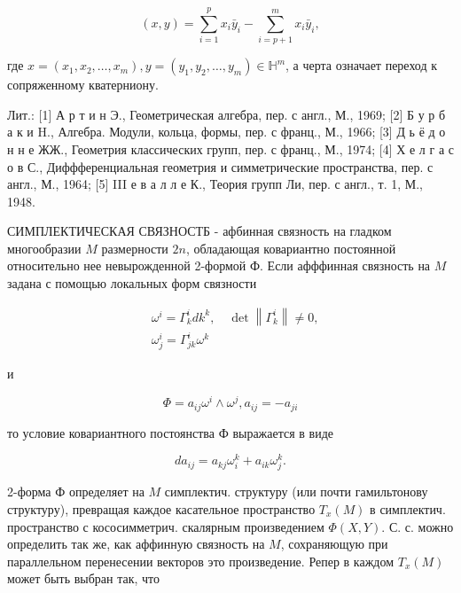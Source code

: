 \documentclass[10pt]{article}
\begin{document}
\[

(x, y)=\sum_{i=1}^{p} x_{i} \bar{y}_{i}-\sum_{i=p+1}^{m} x_{i} \bar{y}_{i},

\]



где $x=\left(x_{1}, x_{2}, \ldots, x_{m}\right), y=\left(y_{1}, y_{2}, \ldots, y_{m}\right) \in \mathbb{H}^{m}$, а черта означает переход к сопряженному кватерниону.



Лит.: [1] А р т и н Э., Геометрическая алгебра, пер. с англ., М., 1969; [2] Б у р б а к и H., Алгебра. Модули, кольца, формы, пер. с франц., М., 1966; [3] Д ь ё д о н н е ЖЖ., Геометрия классических групп, пер. с франц., М., 1974; [4] Х е л г а с о в С., Диффференциальная геометрия и симметрические пространства, пер. с англ., М., 1964; [5] III е в а л л е К., Теория групп Ли, пер. с англ., т. 1, М., 1948.



СИМПЛЕКТИЧЕСКАЯ СВЯЗНОСТБ - афбинная связность на гладком многообразии $M$ размерности $2 n$, обладающая ковариантно постоянной относительно нее невырожденной 2-формой Ф. Если афффинная связность на $M$ задана с помощью локальных форм связности



\[

\begin{aligned}

& \omega^{i}=\Gamma_{k}^{i} d k^{k}, \quad \operatorname{det}\left\|\Gamma_{k}^{i}\right\| \neq 0, \\

& \omega_{j}^{i}=\Gamma_{j k}^{i} \omega^{k}

\end{aligned}

\]



и



\[

\Phi=a_{i j} \omega^{i} \wedge \omega^{j}, a_{i j}=-a_{j i}

\]



то условие ковариантного постоянства Ф выражается в виде



\[

d a_{i j}=a_{k j} \omega_{i}^{k}+a_{i k} \omega_{j}^{k} .

\]



2-форма Ф определяет на $M$ симплектич. структуру (или почти гамильтонову структуру), превращая каждое касательное пространство $T_{x}(M)$ в симплектич. пространство с кососимметрич. скалярным произведением $\Phi(X, Y)$. С. с. можно определить так же, как аффинную связность на $M$, сохраняющую при параллельном перенесении векторов это произведение. Репер в каждом $T_{x}(M)$ может быть выбран так, что
\end{document}
